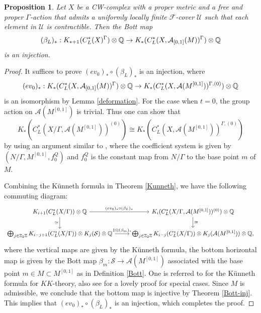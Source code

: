 \documentclass[11pt]{article}
\theoremstyle{definition}
\theoremstyle{plain}
\newtheorem{Pro}[Def]{Proposition}
\def\A{\mathcal A}\def\C{\mathcal C}\def\B{\mathcal B}\def\E{\mathcal E}\def\O{\mathcal O}\def\h{\mathfrak h}\def\K{\mathcal K}\def\F{\mathcal F}\def\P{\mathcal P}\def\L{\mathcal L}\def\R{\mathcal R}\def\Q{\mathcal Q}\def\H{\mathcal H}\def\S{\mathcal S}\def\N{\mathcal N}\def\U{\mathcal U}\def\V{\mathcal V}
\def\ox{\otimes}
\def\ox{\otimes}
\def\Ga{\Gamma}
\begin{document}
\begin{Pro}\label{left column}
Let $X$ be a CW-complex with a proper metric and a free and proper $\Ga$-action that admits a uniformly locally finite $\F$-cover $\U$ such that each element in $\U$ is contractible. Then the Bott map
$$(\beta_L)_*:K_{*+1}(C^*_L(X)^{\Ga})\ox\IQ\to K_*(C^*_L(X,\A_{[0,1]}(M))^{\Ga})\ox\IQ$$
is an injection.
\end{Pro}

\begin{proof}
It suffices to prove $(ev_0)_*\circ(\beta_L)_*$ is an injection, where
$$(ev_0)_*:K_*(C^*_L(X,\A_{[0,1]}(M))^{\Ga})\ox\IQ\to K_*(C^*_L(X,\A(M^{[0,1]}))^{\Ga,(0)})\ox\IQ$$
is an isomorphism by Lemma \ref{deformation}. For the case when $t=0$, the group action on $\A(M^{[0,1]})$ is trivial. Thus one can show that
$$K_*(C^*_L(X/\Ga,\A(M^{[0,1]}))^{(0)})\cong K_*(C^*_L(X,\A(M^{[0,1]}))^{\Ga,(0)})$$
by using an argument similar to \cite[Theorem 6.5.15]{HIT2020}, where the coefficient system is given by $(N/\Ga,M^{[0,1]},f^Q_0)$ and $f_0^Q$ is the constant map from $N/\Ga$ to the base point $m$ of $M$.

Combining the K\"unneth formula in Theorem \ref{Kunneth}, we have the following commuting diagram:
\[\begin{tikzcd}
K_{i+1}(C^*_L(X/\Ga))\ox\IQ \arrow[r, "(ev_0)_*\circ(\beta_L)_*"] \arrow[d, "\cong"'] & K_i(C^*_L(X/\Ga,\A(M^{[0,1]}))^{(0)})\ox\IQ\arrow[d, "\cong"] \\
\bigoplus_{j\in\IZ_2\IZ}K_{i-j+1}(C^*_L(X/\Ga))\ox K_j(\S)\ox\IQ  \arrow[r, "1\ox(\beta_m)_*"] & \bigoplus_{j\in\IZ_2\IZ}K_{i-j}(C^*_L(X/\Ga))\ox K_j(\A(M^{[0,1]}))\ox\IQ,                
\end{tikzcd}\]
where the vertical maps are given by the K\"unneth formula, the bottom horizontal map is given by the Bott map $\beta_m:\S\to\A(M^{[0,1]})$ associated with the base point $m\in M\subset M^{[0,1]}$ as in Definition \ref{Bott}. One is referred to \cite{Duke1987} for the K\"unneth formula for $KK$-theory, also see \cite[Proposition 2.11]{TopforCII} for a lovely proof for special cases.
Since $M$ is admissible, we conclude that the bottom map is injective by Theorem \ref{Bott-inj}. This implies that $(ev_0)_*\circ(\beta_L)_*$ is an injection, which completes the proof.
\end{proof}
\end{document}
